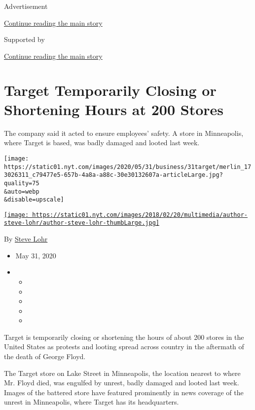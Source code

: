 Advertisement

\protect\hyperlink{after-top}{Continue reading the main story}

Supported by

\protect\hyperlink{after-sponsor}{Continue reading the main story}

\hypertarget{target-temporarily-closing-or-shortening-hours-at-200-stores}{%
\section{Target Temporarily Closing or Shortening Hours at 200
Stores}\label{target-temporarily-closing-or-shortening-hours-at-200-stores}}

The company said it acted to ensure employees' safety. A store in
Minneapolis, where Target is based, was badly damaged and looted last
week.

\texttt{[image: https://static01.nyt.com/images/2020/05/31/business/31target/merlin\_173026311\_c79477e5-657b-4a8a-a88c-30e30132607a-articleLarge.jpg?quality=75\\\&auto=webp\\\&disable=upscale]}

\href{https://www.nytimes.com/by/steve-lohr}{\texttt{[image: https://static01.nyt.com/images/2018/02/20/multimedia/author-steve-lohr/author-steve-lohr-thumbLarge.jpg]}}

By \href{https://www.nytimes.com/by/steve-lohr}{Steve Lohr}

\begin{itemize}
\item
  May 31, 2020
\item
  \begin{itemize}
  \item
  \item
  \item
  \item
  \item
  \end{itemize}
\end{itemize}

Target is temporarily closing or shortening the hours of about 200
stores in the United States as protests and looting spread across
country in the aftermath of the death of George Floyd.

The Target store on Lake Street in Minneapolis, the location nearest to
where Mr. Floyd died, was engulfed by unrest, badly damaged and looted
last week. Images of the battered store have featured prominently in
news coverage of the unrest in Minneapolis, where Target has its
headquarters.

